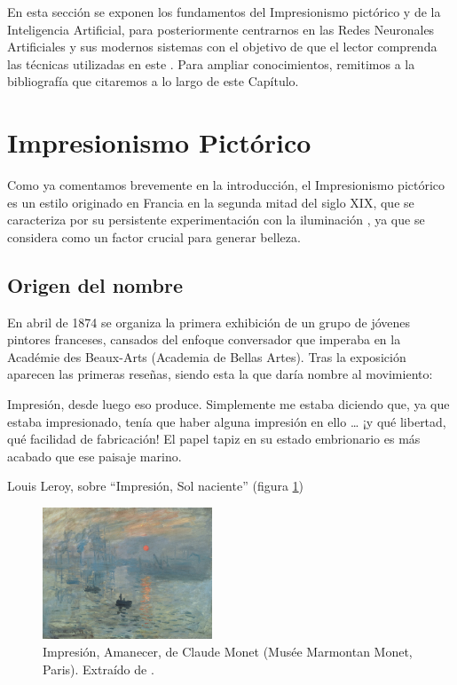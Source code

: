 \documentclass[../main.tex]{subfiles}
\begin{document}
En esta sección se exponen los fundamentos del Impresionismo pictórico y de la Inteligencia Artificial, para posteriormente centrarnos en las Redes Neuronales Artificiales y sus modernos sistemas con el objetivo de que el lector comprenda las técnicas utilizadas en este \tfg. Para ampliar conocimientos, remitimos a la bibliografía que citaremos a lo largo de este Capítulo.

\section{Impresionismo Pictórico}
Como ya comentamos brevemente en la introducción, el Impresionismo pictórico es un estilo originado en Francia en la segunda mitad del siglo XIX, que se caracteriza por su persistente experimentación con la iluminación \cite{Todocuadros}, ya que se considera como un factor crucial para generar belleza.

\subsection{Origen del nombre}

En abril de 1874 se organiza la primera exhibición de un grupo de jóvenes pintores franceses, cansados del enfoque conversador que imperaba en la Académie des Beaux-Arts (Academia de Bellas Artes). Tras la exposición aparecen las primeras reseñas, siendo esta la que daría nombre al movimiento:
\begin{center}
    \begin{minipage}{0.9\linewidth}
        \vspace{5pt}%
        {\small
            Impresión, desde luego eso produce. Simplemente me estaba diciendo que, ya que estaba impresionado, tenía que haber alguna impresión en ello … ¡y qué libertad, qué facilidad de fabricación! El papel tapiz en su estado embrionario es más acabado que ese paisaje marino.
        }
        \begin{flushright}
            Louis Leroy, sobre “Impresión, Sol naciente” (figura \ref{fig:monet_amanecer}) \cite{Sienra2019}
        \end{flushright}
        \vspace{3pt}%
    \end{minipage}
\end{center}

\begin{figure}[h]
    \centering
    \includegraphics[width=0.45\textwidth]{imagenes/Monet_Amanecer.jpg}
    \caption[Impresión, Amanecer, de Claude Monet]{Impresión, Amanecer, de Claude Monet (Musée Marmontan Monet, Paris). Extraído de \cite{Monet1873}.}
    \label{fig:monet_amanecer}
\end{figure}
\end{document}
